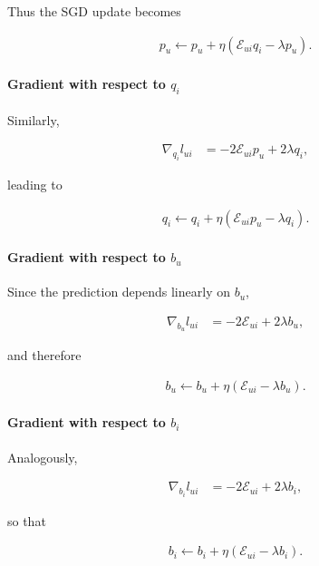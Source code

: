\documentclass[11pt]{article}
\begin{document}
\begin{appendices}
\noindent Thus the SGD update becomes

\begin{align*}
    p_u \leftarrow p_u + \eta(\mathcal{E}_{ui} q_i - \lambda p_u).
\end{align*}

\paragraph{Gradient with respect to $q_i$}

\noindent Similarly,

\begin{align*}
    \nabla_{q_i} l_{ui}
    &= -2\mathcal{E}_{ui} p_u + 2\lambda q_i,
\end{align*}

\noindent leading to

\begin{align*}
    q_i \leftarrow q_i + \eta(\mathcal{E}_{ui} p_u - \lambda q_i).
\end{align*}

\paragraph{Gradient with respect to $b_u$}

\noindent Since the prediction depends linearly on $b_u$,

\begin{align*}
    \nabla_{b_u} l_{ui}
    &= -2\mathcal{E}_{ui} + 2\lambda b_u,
\end{align*}

\noindent and therefore

\begin{align*}
    b_u \leftarrow b_u + \eta(\mathcal{E}_{ui} - \lambda b_u).
\end{align*}

\paragraph{Gradient with respect to $b_i$}

\noindent Analogously,

\begin{align*}
    \nabla_{b_i} l_{ui}
    &= -2\mathcal{E}_{ui} + 2\lambda b_i,
\end{align*}

\noindent so that

\begin{align*}
    b_i \leftarrow b_i + \eta(\mathcal{E}_{ui} - \lambda b_i).
\end{align*}


\end{appendices}
\end{document}
